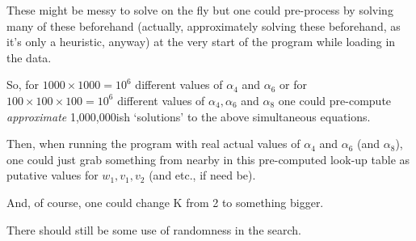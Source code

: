 \documentclass{elsarticle}
\begin{document}
These might be messy to solve on the fly  but one could pre-process by solving many of these beforehand (actually, approximately solving these beforehand, as it's only
a heuristic, anyway) at the very start of the program while loading in the data.

So, for $1000 \times 1000 = 10^6$ different values of $\alpha_4$ and $\alpha_6$
or for $100 \times 100 \times 100 = 10^6$ different values of $\alpha_4, \alpha_6$ and $\alpha_8$
one could pre-compute {\em approximate} 1,000,000ish `solutions' to the above simultaneous equations.

Then, when running the program with real actual values of $\alpha_4$ and $\alpha_6$ (and $\alpha_8$),
one could just grab something from nearby in this pre-computed look-up table
as putative values for $w_1, v_1, v_2$ (and etc., if need be).

And, of course, one could change K from 2 to something bigger.

There should still be some use of randomness in the search.


\end{document}
